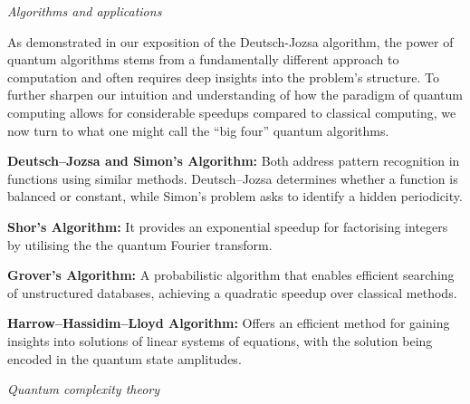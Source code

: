 \documentclass[a4paper, oneside, 12pt]{amsart}
\begin{document}
\begin{center}
  \textit{Algorithms and applications}
\end{center}
\bigskip

As demonstrated in our exposition of the Deutsch-Jozsa algorithm, the power of quantum algorithms stems from a fundamentally different approach to computation and often requires deep insights into the problem’s structure.
To further sharpen our intuition and understanding of how the paradigm of quantum computing allows for considerable speedups compared to classical computing, we now turn to what one might call the ``big four'' quantum algorithms.

\begin{thmlist}
  \item \textbf{Deutsch--Jozsa and Simon's Algorithm:} Both address pattern recognition in functions using similar methods.
  Deutsch--Jozsa determines whether a function is balanced or constant,
  while Simon's problem asks to identify a hidden periodicity.

  \item \textbf{Shor's Algorithm:} It provides an exponential speedup for factorising integers by utilising the  the quantum Fourier transform.

  \item \textbf{Grover's Algorithm:} A probabilistic algorithm that enables efficient searching of unstructured databases, achieving a quadratic speedup over classical methods.

  \item \textbf{Harrow--Hassidim--Lloyd Algorithm:}
  Offers an efficient method for gaining insights into solutions of linear systems of equations, with the solution being encoded in the quantum state amplitudes.
\end{thmlist}
\bigskip

\begin{center}
  \textit{Quantum complexity theory}
\end{center}
\bigskip
\end{document}
